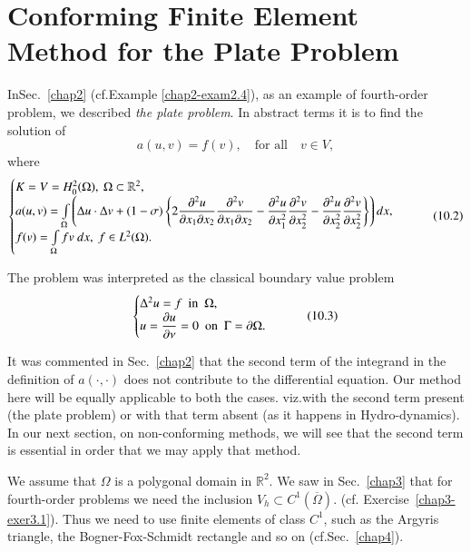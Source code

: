 
\chapter{Conforming Finite Element Method for the Plate
  Problem}\label{chap10}

In\pageoriginale Sec.~\ref{chap2} (cf.\@ Example \ref{chap2-exam2.4}),
as an example 
of fourth-order problem, we described {\em the plate problem}. In
abstract terms it is to find the solution of
\begin{equation*}
a(u,v)=f(v),\quad\text{for all}\quad v\in V,
\end{equation*}
where
{\fontsize{9}{11}\selectfont
\begin{equation*}
\begin{cases}
K=V=H^{2}_{0}(\Omega),\ \Omega\subset \mathbb{R}^{2},\\
a(u,v)=\int\limits_{\Omega}\left(\Delta u\cdot \Delta
v+(1-\sigma)\left\{2\dfrac{\partial^{2}u}{\partial x_{1}\partial x_{2}}\dfrac{\partial^{2}v}{\partial
  x_{1}\partial x_{2}}-\dfrac{\partial^{2}u}{\partial x^{2}_{1}}\dfrac{\partial^{2}v}{\partial
  x^{2}_{2}}-\dfrac{\partial^{2}u}{\partial x^{2}_{2}}\dfrac{\partial^{2}v}{\partial
  x^{2}_{2}}\right\}\right)dx,\\ 
f(v)=\int\limits_{\Omega}fv\ dx,\ f\in L^{2}(\Omega).
\end{cases}\tag{10.2}\label{chap10-eq10.2}
\end{equation*}}

The problem was interpreted as the classical boundary value problem
\begin{equation*}
\begin{cases}
\Delta^{2}u=f\text{~ in~ }\Omega,\\
u=\dfrac{\partial u}{\partial \nu}=0\text{~ on~ }\Gamma=\partial \Omega.
\end{cases}\tag{10.3}\label{chap10-eq10.3}
\end{equation*}

\begin{remark}\label{chap10-rem10.1}
It was commented in Sec.~\ref{chap2} that the second term of the
integrand in the definition of $a(\cdot,\cdot)$ does not contribute to
the differential equation. Our method here will be equally applicable
to both the cases. viz.\@ with the second term present (the plate
problem) or with that term absent (as it happens in
Hydro-dynamics). In our next section, on non-conforming methods, we
will see that the second term is essential in order that we may apply
that method.
\end{remark}

We assume that $\Omega$ is a polygonal domain in $\mathbb{R}^{2}$. We
saw in Sec.~\ref{chap3} that for fourth-order problems we need the
inclusion $V_{h}\subset C^{1}(\overline{\Omega})$. (cf.\@
Exercise~\ref{chap3-exer3.1}). Thus we need to use finite elements of
class $C^{1}$, such as the Argyris triangle, the Bogner-Fox-Schmidt
rectangle and so on (cf.\@ Sec.~\ref{chap4}). 

